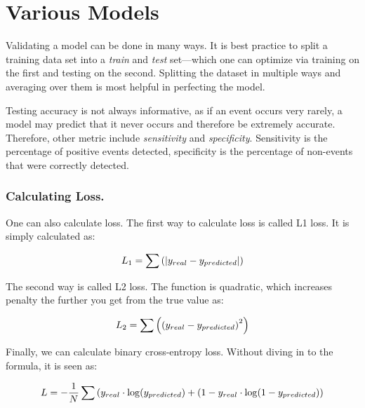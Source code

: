 \section{Various Models}

Validating a model can be done in many ways. It is best practice to split a training data set into a \textit{train} and \textit{test} set---which one can optimize via training on the first and testing on the second. Splitting the dataset in multiple ways and averaging over them is most helpful in perfecting the model. \newline

Testing accuracy is not always informative, as if an event occurs very rarely, a model may predict that it never occurs and therefore be extremely accurate. Therefore, other metric include \textit{sensitivity} and \textit{specificity}. Sensitivity is the percentage of positive events detected, specificity is the percentage of non-events that were correctly detected. 


\subsubsection{Calculating Loss.}
\label{sec:Loss}

One can also calculate loss. The first way to calculate loss is called L1 loss. It is simply calculated as: 

\begin{equation}
\begin{split}
    L_1 = \sum \left(| y_{real} - y_{predicted}|\right)
\end{split}
\end{equation}

The second way is called L2 loss. The function is quadratic, which increases penalty the further you get from the true value as: 

\begin{equation}
\begin{split}
    L_2 = \sum \left(\left(y_{real} - y_{predicted}\right)^2\right)
\end{split}
\end{equation}

Finally, we can calculate binary cross-entropy loss. Without diving in to the formula, it is seen as: 

\begin{equation}
\begin{split}
    L = -\frac{1}{N}\sum \left(y_{real} \cdot \log(y_{predicted}) + (1-y_{real}\cdot\log(1-y_{predicted})\right)
\end{split}
\end{equation}

